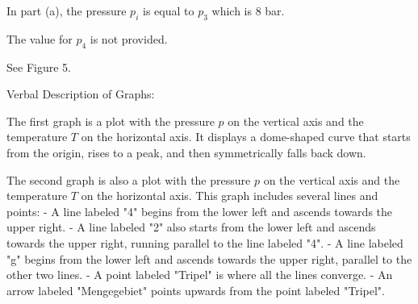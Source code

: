 In part (a), the pressure \( p_i \) is equal to \( p_3 \) which is 8 bar.

The value for \( p_4 \) is not provided.

See Figure 5.

Verbal Description of Graphs:

The first graph is a plot with the pressure \( p \) on the vertical axis and the temperature \( T \) on the horizontal axis. It displays a dome-shaped curve that starts from the origin, rises to a peak, and then symmetrically falls back down.

The second graph is also a plot with the pressure \( p \) on the vertical axis and the temperature \( T \) on the horizontal axis. This graph includes several lines and points:
- A line labeled "4" begins from the lower left and ascends towards the upper right.
- A line labeled "2" also starts from the lower left and ascends towards the upper right, running parallel to the line labeled "4".
- A line labeled "g" begins from the lower left and ascends towards the upper right, parallel to the other two lines.
- A point labeled "Tripel" is where all the lines converge.
- An arrow labeled "Mengegebiet" points upwards from the point labeled "Tripel".